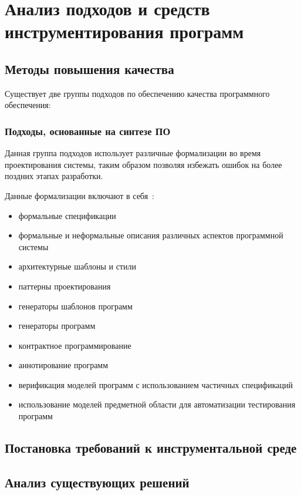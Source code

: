 \chapter{Анализ подходов и средств инструментирования программ}

\section{Методы повышения качества}
\label{sec:quality_methods}

Существует две группы подходов по обеспечению качества программного обеспечения:

\subsection{Подходы, основанные на синтезе ПО}

Данная группа подходов использует различные формализации во время проектирования
системы, таким образом позволяя избежать ошибок на более поздних этапах
разработки.

Данные формализации включают в себя~\cite{itsykson}:

\begin{itemize}
    \item формальные спецификации
    \item формальные и неформальные описания различных аспектов программной
    системы
    \item архитектурные шаблоны и стили
    \item паттерны проектирования
    \item генераторы шаблонов программ
    \item генераторы программ
    \item контрактное программирование
    \item аннотирование программ
    \item верификация моделей программ с использованием частичных спецификаций
    \item использование моделей предметной области для автоматизации
    тестирования программ
\end{itemize}

\section{Постановка требований к инструментальной среде}
\section{Анализ существующих решений}
